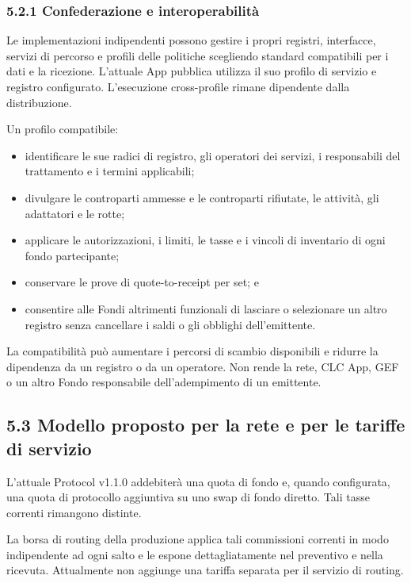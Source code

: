\documentclass[11pt]{article}
\begin{document}
\subsubsection*{5.2.1 Confederazione e interoperabilità}

Le implementazioni indipendenti possono gestire i propri registri, interfacce, servizi di percorso e profili delle politiche scegliendo standard compatibili per i dati e la ricezione. L'attuale App pubblica utilizza il suo profilo di servizio e registro configurato. L'esecuzione cross-profile rimane dipendente dalla distribuzione.

Un profilo compatibile:

\begin{itemize}[leftmargin=*]
\item identificare le sue radici di registro, gli operatori dei servizi, i responsabili del trattamento e i termini applicabili;
\item divulgare le controparti ammesse e le controparti rifiutate, le attività, gli adattatori e le rotte;
\item applicare le autorizzazioni, i limiti, le tasse e i vincoli di inventario di ogni fondo partecipante;
\item conservare le prove di quote-to-receipt per set; e
\item consentire alle Fondi altrimenti funzionali di lasciare o selezionare un altro registro senza cancellare i saldi o gli obblighi dell'emittente.
\end{itemize}
La compatibilità può aumentare i percorsi di scambio disponibili e ridurre la dipendenza da un registro o da un operatore. Non rende la rete, CLC App, GEF o un altro Fondo responsabile dell'adempimento di un emittente.

\subsection*{5.3 Modello proposto per la rete e per le tariffe di servizio}

L'attuale Protocol v1.1.0 addebiterà una quota di fondo e, quando configurata, una quota di protocollo aggiuntiva su uno swap di fondo diretto. Tali tasse correnti rimangono distinte.

La borsa di routing della produzione applica tali commissioni correnti in modo indipendente ad ogni salto e le espone dettagliatamente nel preventivo e nella ricevuta. Attualmente non aggiunge una tariffa separata per il servizio di routing.
\end{document}
